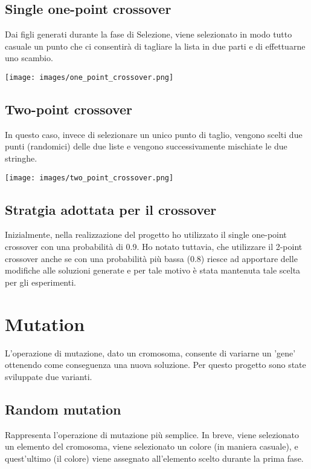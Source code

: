 \documentclass[12pt]{article}
\begin{document}
\begin{enumerate}
\subsection{Single one-point crossover}
Dai figli generati durante la fase di Selezione, viene selezionato in modo tutto casuale un punto che ci consentirà di tagliare la lista in due parti e di effettuarne uno scambio.

\begin{center}
\texttt{[image: images/one\_point\_crossover.png]}
\end{center}
\subsection{Two-point crossover}
In questo caso, invece di selezionare un unico punto di taglio, vengono scelti due punti (randomici) delle due liste e vengono successivamente mischiate le due stringhe.

\begin{center}
\texttt{[image: images/two\_point\_crossover.png]}
\end{center}
\subsection{Stratgia adottata per il crossover}

Inizialmente, nella realizzazione del progetto ho utilizzato il single one-point crossover con una probabilità di 0.9. Ho notato tuttavia, che utilizzare il 2-point crossover anche se con una probabilità più bassa (0.8) riesce ad apportare delle modifiche alle soluzioni generate e per tale motivo è stata mantenuta tale scelta per gli esperimenti. 


\section{Mutation}
L'operazione di mutazione, dato un cromosoma, consente di variarne un 'gene' ottenendo come conseguenza una nuova soluzione. Per questo progetto sono state sviluppate due varianti.

\subsection{Random mutation}
Rappresenta l'operazione di mutazione più semplice. In breve, viene selezionato un elemento del cromosoma, viene selezionato un colore (in maniera casuale), e quest'ultimo (il colore) viene assegnato all'elemento scelto durante la prima fase.


\end{enumerate}
\end{document}
